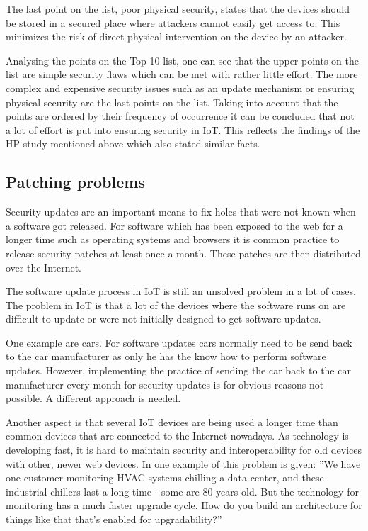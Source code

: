 \documentclass[conference]{IEEEtran}
\begin{document}
The last point on the list, poor physical security, states that the devices 
should be stored in a secured place where attackers cannot easily get access 
to. This minimizes the risk of direct physical intervention on the device by an 
attacker.

Analysing the points on the Top 10 list, one can see that the upper points on 
the list are simple security flaws which can be met with rather little effort. 
The more complex and expensive security issues such as an update mechanism or 
ensuring physical security are the last points on the list. Taking into account 
that the points are ordered by their frequency of occurrence it can be 
concluded that not a lot of effort is put into ensuring security in IoT. This 
reflects the findings of the HP study mentioned above which also stated similar 
facts.


\subsection{Patching problems}
Security updates are an important means to fix holes that were not known when a 
software got released. For software which has been exposed to the web for a 
longer time such as operating systems and browsers it is common practice to 
release security patches at least once a month. These patches are then 
distributed over the Internet.

The software update process in IoT is still an unsolved problem in a lot of 
cases. The problem in IoT is that a lot of the devices where the software runs 
on are difficult to update or were not initially designed to get software 
updates. 

One example are cars. For software updates cars normally need to be send back 
to the car manufacturer as only he has the know how to perform software 
updates. However, implementing the practice of sending the car back to the car 
manufacturer every month for security updates is for obvious reasons not 
possible. A different approach is needed.

Another aspect is that several IoT devices are being used a longer time than 
common devices that are connected to the Internet nowadays. As technology is 
developing fast, it is hard to maintain security and interoperability for old 
devices with other, newer web devices. In \cite{arstechnicaPage} one example of 
this problem is given: ''We have one customer monitoring HVAC systems chilling 
a data center, and these industrial chillers last a long time - some are 80 
years old. But the technology for monitoring has a much faster upgrade cycle. 
How do you build an architecture for things like that that's enabled for  
upgradability?'' 
\end{document}
